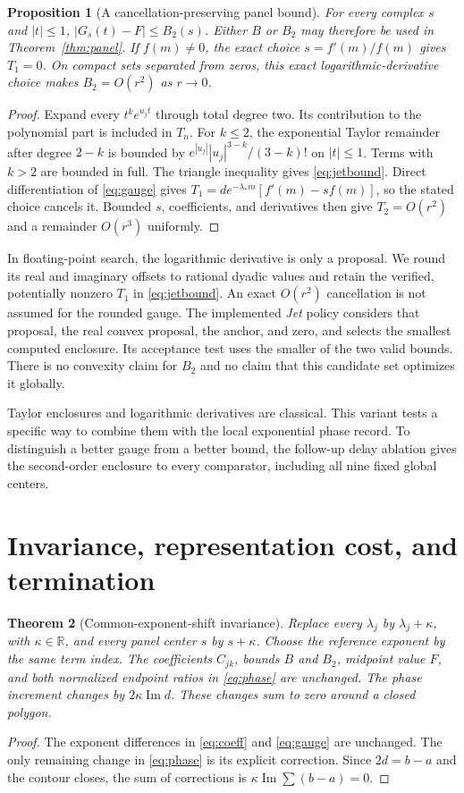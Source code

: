 \documentclass[11pt,a4paper]{article}
\newtheorem{theorem}{Theorem}
\newtheorem{proposition}[theorem]{Proposition}
\DeclareMathOperator{\Impart}{Im}
\newcommand{\RR}{\mathbb R}
\begin{document}
\begin{proposition}[A cancellation-preserving panel bound]\label{prop:jet}
For every complex $s$ and $|t|\le1$, $|G_s(t)-F|\le B_2(s)$. Either $B$ or $B_2$ may therefore be used in Theorem~\ref{thm:panel}. If $f(m)\ne0$, the exact choice $s=f'(m)/f(m)$ gives $T_1=0$. On compact sets separated from zeros, this exact logarithmic-derivative choice makes $B_2=O(r^2)$ as $r\to0$.
\end{proposition}
\begin{proof}
Expand every $t^k e^{u_jt}$ through total degree two. Its contribution to the polynomial part is included in $T_n$. For $k\le2$, the exponential Taylor remainder after degree $2-k$ is bounded by $e^{|u_j|}|u_j|^{3-k}/(3-k)!$ on $|t|\le1$. Terms with $k>2$ are bounded in full. The triangle inequality gives \eqref{eq:jetbound}. Direct differentiation of \eqref{eq:gauge} gives $T_1=d e^{-\lambda_*m}[f'(m)-sf(m)]$, so the stated choice cancels it. Bounded $s$, coefficients, and derivatives then give $T_2=O(r^2)$ and a remainder $O(r^3)$ uniformly.
\end{proof}

In floating-point search, the logarithmic derivative is only a proposal. We round its real and imaginary offsets to rational dyadic values and retain the verified, potentially nonzero $T_1$ in \eqref{eq:jetbound}. An exact $O(r^2)$ cancellation is not assumed for the rounded gauge. The implemented \emph{Jet} policy considers that proposal, the real convex proposal, the anchor, and zero, and selects the smallest computed enclosure. Its acceptance test uses the smaller of the two valid bounds. There is no convexity claim for $B_2$ and no claim that this candidate set optimizes it globally.

Taylor enclosures and logarithmic derivatives are classical. This variant tests a specific way to combine them with the local exponential phase record. To distinguish a better gauge from a better bound, the follow-up delay ablation gives the second-order enclosure to every comparator, including all nine fixed global centers.

\section{Invariance, representation cost, and termination}
\begin{theorem}[Common-exponent-shift invariance]\label{thm:shift}
Replace every $\lambda_j$ by $\lambda_j+\kappa$, with $\kappa\in\RR$, and every panel center $s$ by $s+\kappa$. Choose the reference exponent by the same term index. The coefficients $C_{jk}$, bounds $B$ and $B_2$, midpoint value $F$, and both normalized endpoint ratios in \eqref{eq:phase} are unchanged. The phase increment changes by $2\kappa\Impart d$. These changes sum to zero around a closed polygon.
\end{theorem}
\begin{proof}
The exponent differences in \eqref{eq:coeff} and \eqref{eq:gauge} are unchanged. The only remaining change in \eqref{eq:phase} is its explicit correction. Since $2d=b-a$ and the contour closes, the sum of corrections is $\kappa\Impart\sum(b-a)=0$.
\end{proof}
\end{document}
